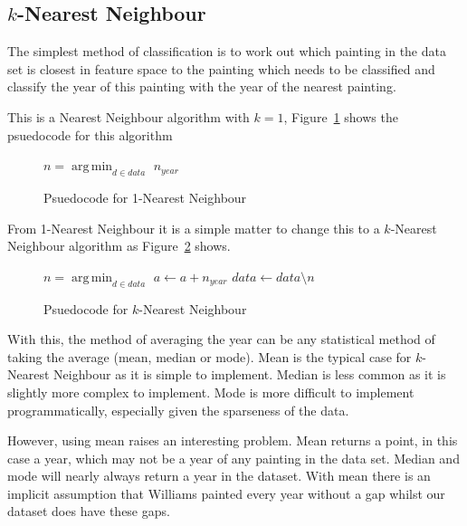 \subsection{$k$-Nearest Neighbour}
The simplest method of classification is to work out which painting in the data set is closest in
feature space to the painting which needs to be classified and classify the year of this painting
with the year of the nearest painting.

This is a Nearest Neighbour algorithm with $k=1$, Figure~\ref{fig:1nn} shows the psuedocode
for this algorithm

\begin{figure}[h]
\begin{algorithmic}
\State $n = \operatorname*{arg\,min}_{d \in data}$ 
\State\Return $n_{year}$
\EndFunction
\end{algorithmic}
\caption{Psuedocode for 1-Nearest Neighbour}\label{fig:1nn}
\end{figure}

From 1-Nearest Neighbour it is a simple matter to change this to a $k$-Nearest Neighbour algorithm
as Figure~\ref{fig:knn} shows.

\begin{figure}[h]
\begin{algorithmic}
\State $n = \operatorname*{arg\,min}_{d \in data}$ 
\State $a \gets a + n_{year}$
\State $data \gets data \setminus n$
\EndFor
\State \Return {}
\EndFunction
\end{algorithmic}
\caption{Psuedocode for $k$-Nearest Neighbour}\label{fig:knn}
\end{figure}

With this, the method of averaging the year can be any statistical method of taking the average
(mean, median or mode). Mean is the typical case for $k$-Nearest Neighbour as it is simple to
implement. Median is less common as it is slightly more complex to implement. Mode is more 
difficult to implement programmatically, especially given the sparseness of the data. 

However, using mean raises an interesting problem. Mean returns a point, in this case a year, 
which may not be a year of any painting in the data set. Median and mode will nearly always return
a year in the dataset. With mean there is an implicit assumption that Williams painted every year
without a gap whilst our dataset does have these gaps. 


